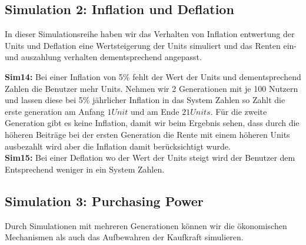 \subsection{Simulation 2: Inflation und Deflation}

In dieser Simulationsreihe haben wir das Verhalten von Inflation entwertung der Units und Deflation eine Wertsteigerung der Units simuliert und das Renten ein- und auszahlung verhalten dementsprechend angepasst.

\textbf{Sim14:} Bei einer Inflation von 5\% fehlt der Wert der Units und dementsprechend Zahlen die Benutzer mehr Units. Nehmen wir 2 Generationen mit je 100 Nutzern und lassen diese bei 5\% jährlicher Inflation in das System Zahlen so Zahlt die erste generation am Anfang $1 Unit$  und am Ende $21 Units$. Für die zweite Generation gibt es keine Inflation, damit wir beim Ergebnis sehen, dass durch die höheren Beiträge bei der ersten Generation die Rente mit einem höheren Units ausbezahlt wird aber die Inflation damit berücksichtigt wurde. \\
\textbf{Sim15:} Bei einer Deflation wo der Wert der Units steigt wird der Benutzer dem Entsprechend weniger in ein System Zahlen.

\begin{table}[h!]
\centering
{}
\end{table}


\subsection{Simulation 3: Purchasing Power}

Durch Simulationen mit mehreren Generationen können wir die ökonomischen Mechanismen als auch das Aufbewahren der Kaufkraft simulieren.
